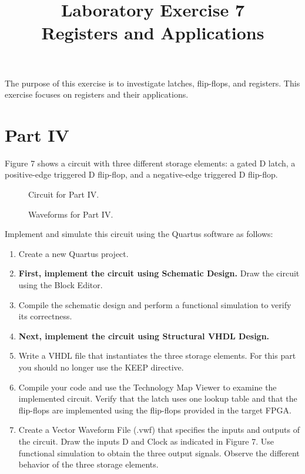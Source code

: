 \documentclass{article}
\title{Laboratory Exercise 7 \\ Registers and Applications}
\author{}
\date{}
\begin{document}
\maketitle

The purpose of this exercise is to investigate latches, flip-flops, and registers. This exercise focuses on registers and their applications.

\setcounter{figure}{6}

\section*{Part IV}

Figure 7 shows a circuit with three different storage elements: a gated D latch, a positive-edge triggered D flip-flop, and a negative-edge triggered D flip-flop.

\begin{figure}[H]
    \centering
    
    \caption{Circuit for Part IV.}
    \label{fig:three_storage}
\end{figure}

\begin{figure}[H]
    \centering
    
    \caption{Waveforms for Part IV.}
    \label{fig:three_storage_timing}
\end{figure}

Implement and simulate this circuit using the Quartus software as follows:
\begin{enumerate}
    \item Create a new Quartus project.
    \item \textbf{First, implement the circuit using Schematic Design.} Draw the circuit using the Block Editor.
    \item Compile the schematic design and perform a functional simulation to verify its correctness.
    \item \textbf{Next, implement the circuit using Structural VHDL Design.}
    \item Write a VHDL file that instantiates the three storage elements. For this part you should no longer use the KEEP directive.
    \item Compile your code and use the Technology Map Viewer to examine the implemented circuit. Verify that the latch uses one lookup table and that the flip-flops are implemented using the flip-flops provided in the target FPGA.
    \item Create a Vector Waveform File (.vwf) that specifies the inputs and outputs of the circuit. Draw the inputs D and Clock as indicated in Figure 7. Use functional simulation to obtain the three output signals. Observe the different behavior of the three storage elements.
\end{enumerate}
\end{document}
